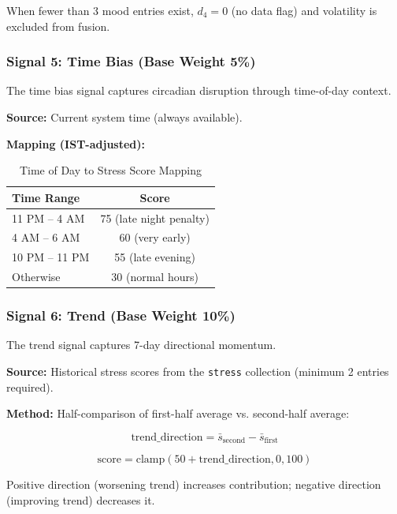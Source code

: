 \documentclass[journal]{IEEEtran}
\begin{document}
When fewer than 3 mood entries exist, $d_4 = 0$ (no data flag) and volatility is excluded from fusion.

\subsubsection{Signal 5: Time Bias (Base Weight 5\%)}

The time bias signal captures circadian disruption through time-of-day context.

\textbf{Source:} Current system time (always available).

\textbf{Mapping (IST-adjusted):}

\begin{table}[htbp]
\caption{Time of Day to Stress Score Mapping}
\centering
\begin{tabular}{lc}
\toprule
\textbf{Time Range} & \textbf{Score} \\
\midrule
11 PM -- 4 AM & 75 (late night penalty) \\
4 AM -- 6 AM & 60 (very early) \\
10 PM -- 11 PM & 55 (late evening) \\
Otherwise & 30 (normal hours) \\
\bottomrule
\end{tabular}
\end{table}

\subsubsection{Signal 6: Trend (Base Weight 10\%)}

The trend signal captures 7-day directional momentum.

\textbf{Source:} Historical stress scores from the \texttt{stress} collection (minimum 2 entries required).

\textbf{Method:} Half-comparison of first-half average vs. second-half average:

\begin{equation}
\text{trend\_direction} = \bar{s}_{\text{second}} - \bar{s}_{\text{first}}
\end{equation}

\begin{equation}
\text{score} = \text{clamp}(50 + \text{trend\_direction}, 0, 100)
\end{equation}

Positive direction (worsening trend) increases contribution; negative direction (improving trend) decreases it.
\end{document}
